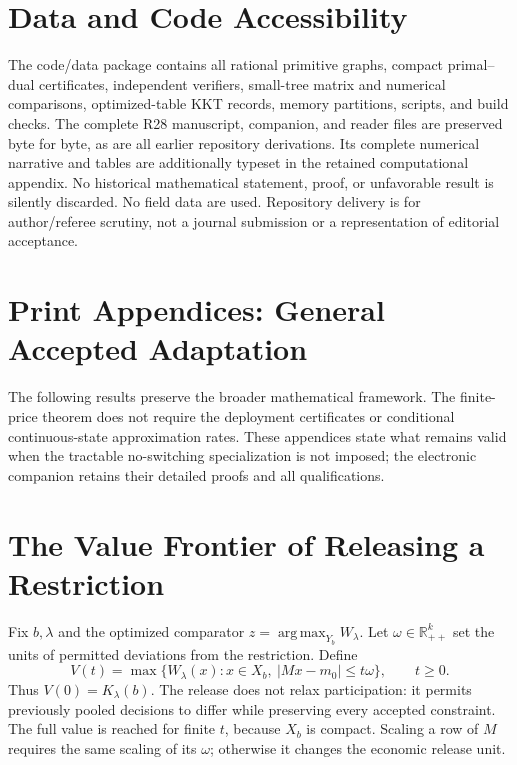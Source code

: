 \documentclass[11pt,letterpaper]{article}
\theoremstyle{definition}\newtheorem{assumption}[theorem]{Assumption}
\newcommand{\R}{\mathbb R}\newcommand{\E}{\mathbb E}
\newcommand{\argmax}{\operatorname*{arg\,max}}
\begin{document}
\section*{Data and Code Accessibility}
The code/data package contains all rational primitive graphs, compact primal--dual certificates, independent verifiers, small-tree matrix and numerical comparisons, optimized-table KKT records, memory partitions, scripts, and build checks. The complete R28 manuscript, companion, and reader files are preserved byte for byte, as are all earlier repository derivations. Its complete numerical narrative and tables are additionally typeset in the retained computational appendix. No historical mathematical statement, proof, or unfavorable result is silently discarded. No field data are used. Repository delivery is for author/referee scrutiny, not a journal submission or a representation of editorial acceptance.

\appendix
\section*{Print Appendices: General Accepted Adaptation}
The following results preserve the broader mathematical framework. The finite-price theorem does not require the deployment certificates or conditional continuous-state approximation rates. These appendices state what remains valid when the tractable no-switching specialization is not imposed; the electronic companion retains their detailed proofs and all qualifications.
\section{The Value Frontier of Releasing a Restriction}\label{sec:release}
Fix $b,\lambda$ and the optimized comparator $z=\argmax_{Y_b}W_\lambda$. Let $\omega\in\R^k_{++}$ set the units of permitted deviations from the restriction. Define
\begin{equation}\label{eq:release}
 V(t)=\max\{W_\lambda(x):x\in X_b,\ |Mx-m_0|\leq t\omega\},\qquad t\geq0.
\end{equation}
Thus $V(0)=K_\lambda(b)$. The release does not relax participation: it permits previously pooled decisions to differ while preserving every accepted constraint. The full value is reached for finite $t$, because $X_b$ is compact. Scaling a row of $M$ requires the same scaling of its $\omega$; otherwise it changes the economic release unit.
\end{document}
